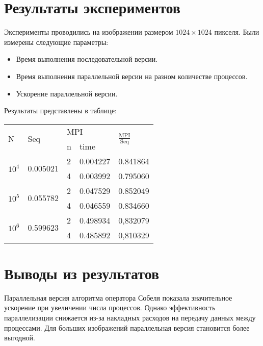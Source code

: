 \documentclass[12pt]{article}
\begin{document}
\newpage
\section*{Результаты экспериментов}
Эксперименты проводились на изображении размером $1024 \times 1024$ пикселя. Были измерены следующие параметры:
\begin{itemize}
    \item Время выполнения последовательной версии.
    \item Время выполнения параллельной версии на разном количестве процессов.
    \item Ускорение параллельной версии.
\end{itemize}

Результаты представлены в таблице:
\begin{table}[H]
\begin{tabular}{|l|l|ll|l|}
\hline
\multirow{2}{*}{N}      & \multirow{2}{*}{Seq}       & \multicolumn{2}{l|}{MPI}          & \multirow{2}{*}{$\frac{\text{MPI}}{\text{Seq}}$} \\ \cline{3-4}
                        &                            & \multicolumn{1}{l|}{n} & time     &                           \\ \hline
\multirow{2}{*}{$10^4$} & \multirow{2}{*}{0.005021}  & \multicolumn{1}{l|}{2} & 0.004227 & 0.841864                   \\ \cline{3-5} 
                        &                            & \multicolumn{1}{l|}{4} & 0.003992 & 0.795060                 \\ \hline
\multirow{2}{*}{$10^5$} & \multirow{2}{*}{0.055782}  & \multicolumn{1}{l|}{2} & 0.047529 & 0.852049                 \\ \cline{3-5} 
                        &                            & \multicolumn{1}{l|}{4} & 0.046559 & 0.834660                  \\ \hline
\multirow{2}{*}{$10^6$} & \multirow{2}{*}{0.599623}  & \multicolumn{1}{l|}{2} & 0.498934 & 0,832079                  \\ \cline{3-5} 
                        &                            & \multicolumn{1}{l|}{4} & 0.485892 & 0,810329                  \\ \hline
\end{tabular}
\end{table}


\newpage
\section*{Выводы из результатов}
Параллельная версия алгоритма оператора Собеля показала значительное ускорение при увеличении числа процессов. Однако эффективность параллелизации снижается из-за накладных расходов на передачу данных между процессами. Для больших изображений параллельная версия становится более выгодной.
\end{document}
